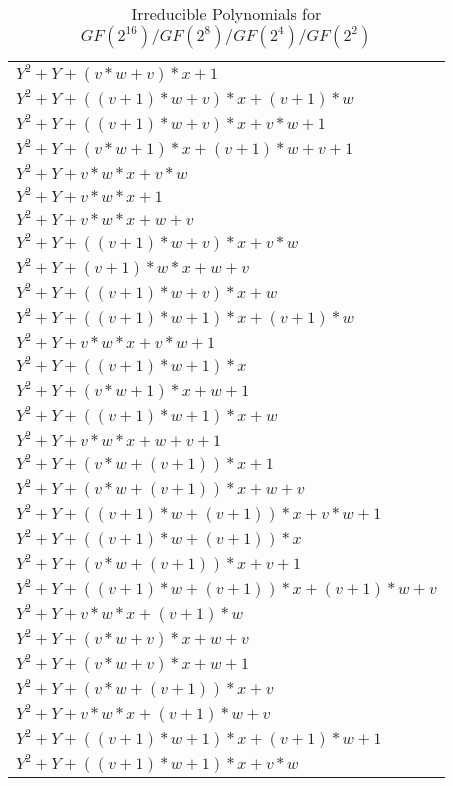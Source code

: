 \documentclass[12pt]{article}
\begin{document}
\begin{adjustwidth}{-2cm}{}
\begin{center}
\begin{longtable}{|l|}
\caption[INNER TITLE]{Irreducible Polynomials for $GF(2^{16})/GF(2^8)/GF(2^4)/GF(2^2)$}\\
\hline
	$Y^2 + Y + (v*w + v)*x + 1$ \\
	$Y^2 + Y + ((v + 1)*w + v)*x + (v + 1)*w$ \\
	$Y^2 + Y + ((v + 1)*w + v)*x + v*w + 1$ \\
	$Y^2 + Y + (v*w + 1)*x + (v + 1)*w + v + 1$ \\
	$Y^2 + Y + v*w*x + v*w$ \\ 
	$Y^2 + Y + v*w*x + 1$ \\
	$Y^2 + Y + v*w*x + w + v$ \\
	$Y^2 + Y + ((v + 1)*w + v)*x + v*w$ \\
	$Y^2 + Y + (v + 1)*w*x + w + v$ \\
	$Y^2 + Y + ((v + 1)*w + v)*x + w$ \\
	$Y^2 + Y + ((v + 1)*w + 1)*x + (v + 1)*w$ \\
	$Y^2 + Y + v*w*x + v*w + 1$ \\
	$Y^2 + Y + ((v + 1)*w + 1)*x$ \\
	$Y^2 + Y + (v*w + 1)*x + w + 1$ \\
	$Y^2 + Y + ((v + 1)*w + 1)*x + w$ \\
	$Y^2 + Y + v*w*x + w + v + 1$ \\
	$Y^2 + Y + (v*w + (v + 1))*x + 1$ \\
	$Y^2 + Y + (v*w + (v + 1))*x + w + v$ \\
	$Y^2 + Y + ((v + 1)*w + (v + 1))*x + v*w + 1$ \\
	$Y^2 + Y + ((v + 1)*w + (v + 1))*x$ \\
	$Y^2 + Y + (v*w + (v + 1))*x + v + 1$ \\
	$Y^2 + Y + ((v + 1)*w + (v + 1))*x + (v + 1)*w + v$ \\
	$Y^2 + Y + v*w*x + (v + 1)*w$ \\
	$Y^2 + Y + (v*w + v)*x + w + v$ \\
	$Y^2 + Y + (v*w + v)*x + w + 1$ \\
	$Y^2 + Y + (v*w + (v + 1))*x + v$ \\
	$Y^2 + Y + v*w*x + (v + 1)*w + v$ \\
	$Y^2 + Y + ((v + 1)*w + 1)*x + (v + 1)*w + 1$ \\
	$Y^2 + Y + ((v + 1)*w + 1)*x + v*w$ \\

\end{longtable}
\end{center}
\end{adjustwidth}
\end{document}
